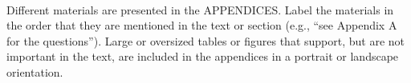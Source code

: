 
\setlength{\parindent}{0pt}
\setlength{\parskip}{1em}
\setlength{\baselineskip}{1.5em}

\begin{center}
  \fontsize{14}{17}\\
  \fontsize{14}{25}
\end{center}

Different materials are presented in the APPENDICES. Label the materials in the order that they are mentioned in the text or section (e.g., “see Appendix A for the questions”). Large or oversized tables or figures that support, but are not important in the text, are included in the appendices in a portrait or landscape orientation.

